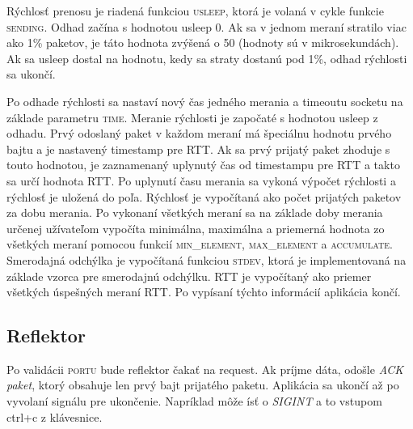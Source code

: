\documentclass[a4paper, 11pt]{article}
\begin{document}
Rýchlosť prenosu je riadená funkciou \textsc{usleep}, ktorá je volaná v cykle funkcie \textsc{sending}. Odhad začína s hodnotou usleep 0. Ak sa v jednom meraní stratilo viac ako 1\% paketov, je táto hodnota zvýšená o 50 (hodnoty sú v mikrosekundách). Ak sa usleep dostal na hodnotu, kedy sa straty dostanú pod 1\%, odhad rýchlosti sa ukončí.

Po odhade rýchlosti sa nastaví nový čas jedného merania a timeoutu socketu na základe parametru \textsc{time}. Meranie rýchlosti je započaté s hodnotou usleep z odhadu. Prvý odoslaný paket v každom meraní má špeciálnu hodnotu prvého bajtu a je nastavený timestamp pre RTT. Ak sa prvý prijatý paket zhoduje s touto hodnotou, je zaznamenaný uplynutý čas od timestampu pre RTT a takto sa určí hodnota RTT. Po uplynutí času merania sa vykoná výpočet rýchlosti a rýchlosť je uložená do poľa. Rýchlosť je vypočítaná ako počet prijatých paketov za dobu merania. Po vykonaní všetkých meraní sa na základe doby merania určenej užívateľom vypočíta minimálna, maximálna a priemerná hodnota zo všetkých meraní pomocou funkcií \textsc{min\_element}, \textsc{max\_element} a \textsc{accumulate}.
Smerodajná odchýlka je vypočítaná funkciou \textsc{stdev}, ktorá je implementovaná na základe vzorca pre smerodajnú odchýlku. RTT je vypočítaný ako priemer všetkých úspešných meraní RTT. Po vypísaní týchto informácií aplikácia končí.
 
\subsection{Reflektor}
Po validácii \textsc{portu} bude reflektor čakať na request. Ak príjme dáta, odošle \emph{ACK paket}, ktorý obsahuje len prvý bajt prijatého paketu. Aplikácia sa ukončí až po vyvolaní signálu pre ukončenie. Napríklad môže ísť o \emph{SIGINT} a to vstupom ctrl+c z klávesnice.
\end{document}
